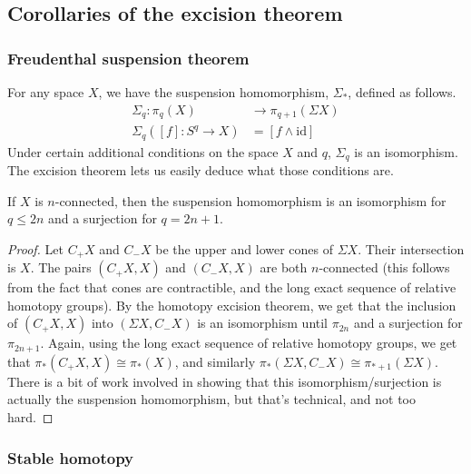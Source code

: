   \subsection{Corollaries of the excision theorem}
  \label{sec:coroll-excis-theor}

  \subsubsection{Freudenthal suspension theorem}
  \label{sec:freud-susp-theor}

  For any space $X$, we have the suspension homomorphism, $\Sigma_{\ast}$, defined as follows.
  \begin{align*}
    \Sigma_{q}: \pi_q(X) &\to \pi_{q+1}(\Sigma X) \\
    \Sigma_{q}([f]: S^q \to X) &= [f \wedge \mathrm{id}]
  \end{align*}
  Under certain additional conditions on the space $X$ and $q$, $\Sigma_q$ is an isomorphism.  The
  excision theorem lets us easily deduce what those conditions are.

\begin{thm}
  If $X$ is $n$-connected, then the suspension homomorphism is an isomorphism for $q \leq 2n$ and a
  surjection for $q = 2n+1$.
\end{thm}

\begin{proof}
  Let $C_+X$ and $C_-X$ be the upper and lower cones of $\Sigma X$. Their intersection is $X$.  The
  pairs $(C_+X, X)$ and $(C_-X, X)$ are both $n$-connected (this follows from the fact that cones
  are contractible, and the long exact sequence of relative homotopy groups). By the homotopy
  excision theorem, we get that the inclusion of $(C_+X, X)$ into $(\Sigma X, C_-X)$ is an
  isomorphism until $\pi_{2n}$ and a surjection for $\pi_{2n+1}$. Again, using the long exact
  sequence of relative homotopy groups, we get that $\pi_{\ast}(C_+X, X) \cong \pi_{\ast}(X)$, and
  similarly $\pi_{\ast}(\Sigma X, C_-X) \cong \pi_{\ast+1}(\Sigma X)$. There is a bit of work
  involved in showing that this isomorphism/surjection is actually the suspension homomorphism, but
  that's technical, and not too hard.
\end{proof}

\subsubsection{Stable homotopy}
\label{sec:stable-homotopy}

